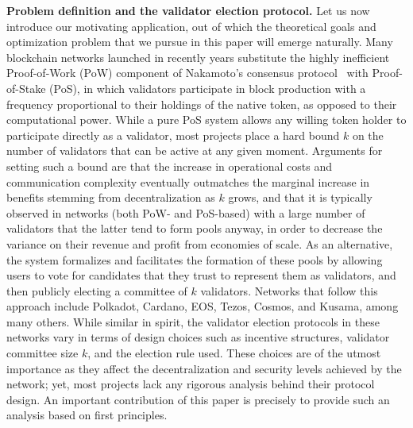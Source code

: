 \vspace{5mm}
\textbf{Problem definition and the validator election protocol.}
Let us now introduce our motivating application, out of which the theoretical goals and optimization problem that we pursue in this paper will emerge naturally. 
Many blockchain networks launched in recently years substitute the highly inefficient Proof-of-Work (PoW) component of Nakamoto's consensus protocol~\cite{nakamoto2019bitcoin} with Proof-of-Stake (PoS), in which validators participate in block production with a frequency proportional to their holdings of the native token, as opposed to their computational power. 
While a pure PoS system allows any willing token holder to participate directly as a validator, most projects place a hard bound $k$ on the number of validators that can be active at any given moment. Arguments for setting such a bound are that the increase in operational costs and communication complexity eventually outmatches the marginal increase in benefits stemming from decentralization as $k$ grows, and that it is typically observed in networks (both PoW- and PoS-based) with a large number of validators that the latter tend to form pools anyway, in order to decrease the variance on their revenue and profit from economies of scale. 
As an alternative, the system formalizes and facilitates the formation of these pools by allowing users to vote for candidates that they trust to represent them as validators, and then publicly electing a committee of $k$ validators. 
Networks that follow this approach include Polkadot, Cardano, EOS, Tezos, Cosmos, and Kusama, among many others. 
While similar in spirit, the validator election protocols in these networks vary in terms of design choices such as incentive structures, validator committee size $k$, and the election rule used. These choices are of the utmost importance as they affect the decentralization and security levels achieved by the network; yet, most projects lack any rigorous analysis behind their protocol design. An important contribution of this paper is precisely to provide such an analysis based on first principles.


